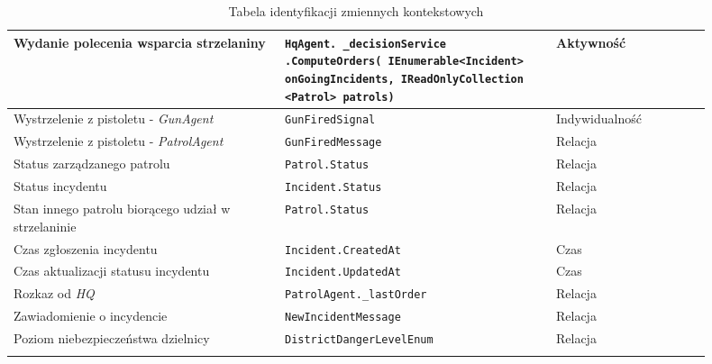 \begin{longtable}{|p{0.35\linewidth}|p{0.35\linewidth}|p{0.20\linewidth}|}
     \hline
     Wydanie polecenia wsparcia strzelaniny & \texttt{HqAgent. \_decisionService .ComputeOrders( IEnumerable<Incident> onGoingIncidents, IReadOnlyCollection <Patrol> patrols)} & Aktywność \\
     \hline %
     Wystrzelenie z pistoletu - \emph{GunAgent} & \texttt{GunFiredSignal} & Indywidualność \\
     \hline
     Wystrzelenie z pistoletu  - \emph{PatrolAgent} & \texttt{GunFiredMessage} & Relacja \\
     \hline
     Status zarządzanego patrolu & \texttt{Patrol.Status} & Relacja \\
     \hline
     Status incydentu & \texttt{Incident.Status} & Relacja \\
     \hline
     Stan innego patrolu biorącego udział w strzelaninie & \texttt{Patrol.Status} & Relacja \\
     \hline
     Czas zgłoszenia incydentu & \texttt{Incident.CreatedAt} & Czas \\
     \hline
     Czas aktualizacji statusu incydentu & \texttt{Incident.UpdatedAt} & Czas \\
     \hline
      Rozkaz od \emph{HQ} & \texttt{PatrolAgent.\_lastOrder} & Relacja \\
     \hline
     Zawiadomienie o incydencie & \texttt{NewIncidentMessage} & Relacja \\
     \hline
     Poziom niebezpieczeństwa dzielnicy & \texttt{DistrictDangerLevel\-Enum} & Relacja \\
     \hline
\caption{Tabela identyfikacji zmiennych kontekstowych}
\label{tab:agentsFeaturesCategorization}
\end{longtable}

